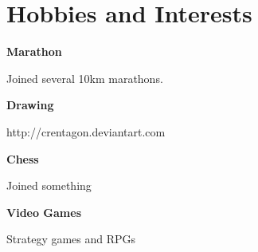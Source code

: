 \section*{Hobbies and Interests}

\speciallinebreak
\begin{multicols}{2}

\begin{description}
	\item {\color{special-color}\textbf{Marathon}}
	\item Joined several 10km marathons.
\end{description}

\begin{description}
	\item {\color{special-color}\textbf{Drawing}}
	\item http://crentagon.deviantart.com
\end{description}

\begin{description}
	\item {\color{special-color}\textbf{Chess}}
	\item Joined something
\end{description}

\begin{description}
	\item {\color{special-color}\textbf{Video Games}}
	\item Strategy games and RPGs
\end{description}

\end{multicols}